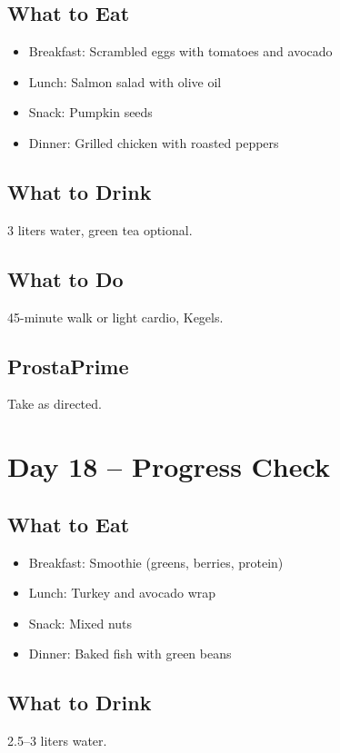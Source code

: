 \documentclass[11pt,oneside]{book}
\begin{document}
\section*{What to Eat}
\begin{itemize}[leftmargin=*]
\item Breakfast: Scrambled eggs with tomatoes and avocado
\item Lunch: Salmon salad with olive oil
\item Snack: Pumpkin seeds
\item Dinner: Grilled chicken with roasted peppers
\end{itemize}

\section*{What to Drink}
3 liters water, green tea optional.

\section*{What to Do}
45-minute walk or light cardio, Kegels.

\section*{ProstaPrime}
Take as directed.

\clearpage


\chapter*{Day 18 – Progress Check}

\section*{What to Eat}
\begin{itemize}[leftmargin=*]
\item Breakfast: Smoothie (greens, berries, protein)
\item Lunch: Turkey and avocado wrap
\item Snack: Mixed nuts
\item Dinner: Baked fish with green beans
\end{itemize}

\section*{What to Drink}
2.5--3 liters water.
\end{document}
